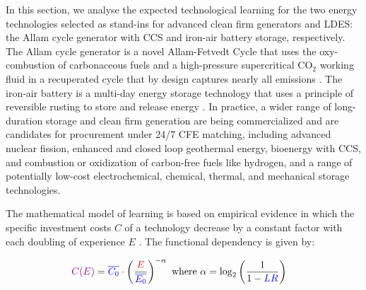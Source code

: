 \documentclass[pdflatex,sn-basic, Numbered]{sn-jnl}
\theoremstyle{thmstyleone}%
\theoremstyle{thmstyletwo}%
\theoremstyle{thmstylethree}%
\begin{document}
In this section, we analyse the expected technological learning for the two energy technologies selected as stand-ins for advanced clean firm generators and LDES: the Allam cycle generator with CCS and iron-air battery storage, respectively. The Allam cycle generator is a novel Allam-Fetvedt Cycle that uses the oxy-combustion of carbonaceous fuels and a high-pressure supercritical CO$_2$ working fluid in a recuperated cycle that by design captures nearly all emissions \cite{allamDemonstrationAllamCycle2017}. The iron-air battery is a multi-day energy storage technology that uses a principle of reversible rusting to store and release energy \cite{FormEnergyLatest2024}. In practice, a wider range of long-duration storage and clean firm generation are being commercialized and are candidates for procurement under 24/7 CFE matching, including advanced nuclear fission, enhanced and closed loop geothermal energy, bioenergy with CCS, and combustion or oxidization of carbon-free fuels like hydrogen, and a range of potentially low-cost electrochemical, chemical, thermal, and mechanical storage technologies.

The mathematical model of learning is based on empirical evidence in which the speciﬁc investment costs $C$ of a technology decrease by a constant factor with each doubling of experience $E$ \cite{wayEmpiricallyGroundedTechnology2022a}. The functional dependency is given by:

\begin{equation}
  \begin{aligned}
    \color{violet}C(E)\color{black} &= \color{blue}\overline{C_0}\color{black}  \cdot \left( \frac{\color{red}E}{\color{blue}\overline{E_0}\color{black}} \right)^{-\color{black}\alpha} \text{ where } \color{black}\alpha = \color{black}\log_2 \left( \frac{1}{1 - \color{blue}LR\color{black}} \right)
    \label{eq:learning_curve}
  \end{aligned}
\end{equation}
\end{document}
